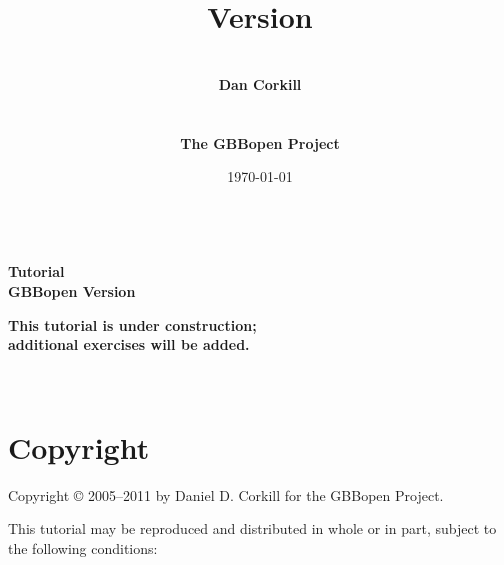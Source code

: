 \documentclass[10pt,twoside,english,pdftex]{article}
\title{\vspace{3in}{\LARGE\textbf{GBBopen Tutorial}}\\[14pt] 
{\Large\textbf{Version \gbbopenversion}}}
\author{\vspace{1in}~\\{\Large\textbf{Dan Corkill}}\\~\\~\\
  {\Large\textbf{The GBBopen Project}}\\[4pt]
  {\large\textbf{\xsitelink{http://GBBopen.org}{http://GBBopen.org}}}}
\date{\today\\[4pt] \hhmm~\timezone}
\newcommand{\inprogress}{\vfill\textcolor{darkergray}{\textsf{\textbf{This
        tutorial is under construction;\\additional exercises will be added.}}}}
\begin{document}
\T{}
\T\pagestyle{plain}
\T\thispagestyle{empty}
\T\raggedright
\T\sloppy
\T{}\baselineskip
\T\parindent=0pt
\T\maketitle
\T\renewcommand{\headrulewidth}{0pt}

\T\begin{ifhtml}
{\LARGE\bf Tutorial}\\
{\large\bf GBBopen Version \gbbopenversion}
\T\end{ifhtml}

\begin{center}
\inprogress\\
\end{center}


\T\begin{ifhtml}
  \label{sec:introduction}%
  
  \setcounter{htmlautomenu}{0}
\T\end{ifhtml}

\T\thispagestyle{empty}


\T\newpage
\T~
\T\vfill
\W{}
\W\section*{Copyright}

Copyright \copyright{} 2005--2011 by Daniel D. Corkill for the
GBBopen Project.

This tutorial may be reproduced and distributed in whole or in
part, subject to the following conditions: 
\end{document}

